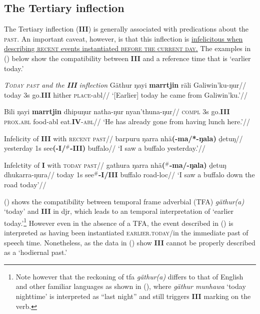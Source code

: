 \xe




\subsection{The Tertiary inflection}\label{desc-iii}

The Tertiary inflection (\textbf{III}) is generally associated with predications about the \textsc{past}. An important caveat, however, is that this inflection is \ul{infelicitous when describing \textsc{recent} events instantiated \textsc{before the current day}.} The examples in (\nextx) below show the compatibility between \textbf{III} and a reference time that is `earlier today.'

\pex \textit{\textsc{Today past} and the \textbf{III} inflection}
\a{}\begingl\gla Gäthur ŋayi \textbf{marrtjin} räli Galiwin'ku-ŋur//
\glb today 3s go.\textbf{III} hither \textsc{place}-\gls{abl}//
\glft`[Earlier] today he came from Galiwin'ku.'//\endgl

\a{}\begingl\gla Bili ŋayi \textbf{marrtjin} dhipuŋur natha-ŋur nyan'thuna-ŋur//
\glb \textsc{compl} 3s go.\textbf{III} \textsc{prox.abl} food-\gls{abl} eat.\textbf{IV}-\textsc{abl}//
\glft`He has already gone from having lunch here.'//\endgl


\a\begingl\glpreamble Infelicity of \textbf{III} with \textsc{recent past}//
\gla barpuru ŋarra nhä\textbf{(-ma/*-ŋala)} ḏetuŋ//
\glb yesterday 1s see\textbf{(-I/$^\#$-III)} buffalo//
\glft`I saw a buffalo yesterday.'\trailingcitation[MD 20180802]//\endgl

\a\begingl\glpreamble Infelctity of \textbf{I} with \textsc{today past}//
\gla gathura ŋarra nhä\textbf{($^\#$-ma/-ŋala)} ḏetuŋ dhukarra-ŋura//
\glb today 1s see\textbf{$ ^\# $-I/III} buffalo road-\gls{loc}//
\glft `I saw a buffalo down the road today'\trailingcitation{[MD 20180802]}//
\endgl
\xe

() shows the compatibility between temporal frame adverbial (TFA) \textit{gäthur(a)} `today' and \textbf{III} in \gls{djr}, which leads to an temporal interpretation of `earlier today.'\footnote{Note however that the reckoning of \gls{tfa} \textit{gäthur(a)} differs to that of English and other familiar languages as shown in (), where \textit{gäthur munhawa} `today nighttime' is interpreted as ``last night'' and still triggers \textbf{III} marking on the verb.} However even in the absence of a \gls{TFA}, the event described in () is interpreted as having been instantiated \textsc{earlier.today}/in the immediate past of speech time. Nonetheless, as the data in (\nextx) show \textbf{III} cannot be properly described as a `hodiernal past.' 


